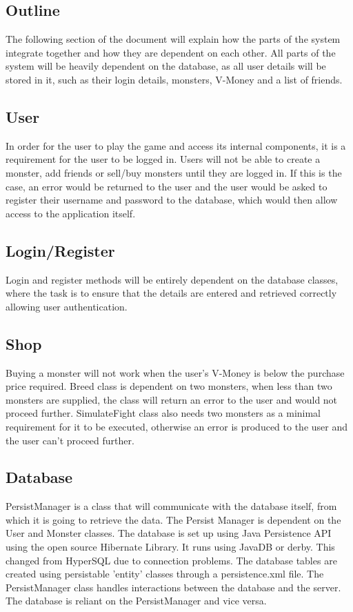 \documentclass[titlepage]{article}
\begin{document}
\subsection {Outline}
The following section of the document will explain how the parts of the
system integrate together and how they are dependent on each other. All parts of the system will be heavily dependent on the database, as all
user details will be stored in it, such as their login details, monsters,
V-Money and a list of friends.
\subsection{User}
In order for the user to play the game and access its internal components,
it is a requirement for the user to be logged in. Users will not be able to create a monster, add friends or sell/buy monsters until they are logged in.
If this is the case, an error would be returned to the user and the user would be asked to register their username
and password to the database, which would then allow access to the application itself.
\subsection{Login/Register}
Login and register methods will be entirely dependent on the database
classes, where the task is to ensure that the details are entered and
retrieved correctly allowing user authentication. 
\subsection {Shop}
Buying a monster will not work when the user's V-Money is below the purchase
price required. Breed class is dependent on two monsters, when less than two monsters are
supplied, the class will return an error to the user and would not proceed further. SimulateFight class also needs two monsters as a minimal requirement for
it to be executed, otherwise an error is produced to the user and the user can't proceed further.
\subsection {Database}
PersistManager is a class that will communicate with the database itself, from which it is going to retrieve the data. The Persist Manager is dependent on the User and Monster classes. The database is set up using Java Persistence API using the open source Hibernate Library. It runs using JavaDB or
derby. This changed from HyperSQL due to connection problems. The database tables are created using persistable
'entity' classes through a persistence.xml file. The PersistManager class handles interactions between
the database and the server. The database is reliant on the PersistManager and vice versa.
\newpage
\end{document}
